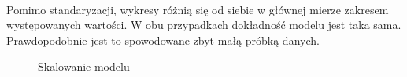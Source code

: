 \documentclass[12pt,a4paper]{article}
\begin{document}
	        \\
	        Pomimo standaryzacji, wykresy różnią się od siebie w głównej mierze zakresem występowanych wartości.
	        W obu przypadkach dokładność modelu jest taka sama. Prawdopodobnie jest to spowodowane zbyt małą próbką danych.
	        \\
	        \begin{figure}
	            \centering
        		\caption{Skalowanie modelu}
        		\label{perceptron_FeatureScaling}
	        \end{figure}
\end{document}
